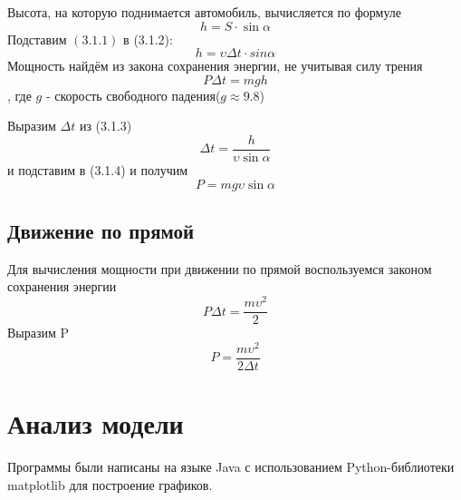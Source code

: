 \documentclass[a4paper, 14pt]{extarticle}
\begin{document}
			Высота, на которую поднимается автомобиль, вычисляется по формуле
			\[ h = S \cdot \sin{\alpha} \tag{3.1.2} \label{eq:special}\]
			Подставим \( (3.1.1) \) в (3.1.2):
			\[ h = \upsilon \Delta t \cdot sin{\alpha}  \tag{3.1.3} \label{eq:special} \]
			Мощность найдём из закона сохранения энергии, не учитывая силу трения
			\[ P \Delta t = mgh  \tag{3.1.4} \label{eq:special}\]
			, где \( g \) - скорость свободного падения(\( g \approx 9.8 \))
			
			Выразим \( \Delta t\) из (3.1.3)
			\[ \Delta t = \dfrac{h}{\upsilon \sin{\alpha}} \tag{3.1.5} \label{eq:special} \]
			и подставим в (3.1.4) и получим
			\[ P = mg \upsilon \sin{\alpha} \tag{3.1.6} \label{eq:special} \]
		\subsection{Движение по прямой}
			Для вычисления мощности при движении по прямой воспользуемся
			законом сохранения энергии
			\[ P \Delta t = \dfrac{m\upsilon^2}{2} \tag{3.2.1} \label{eq:special} \]
			Выразим P
			\[ P = \dfrac{m\upsilon^2}{2\Delta t} \tag{3.2.2} \label{eq:special} \]

	\section{Анализ модели}
		Программы были написаны на языке Java с использованием Python-библиотеки matplotlib для построение графиков.
\end{document}
